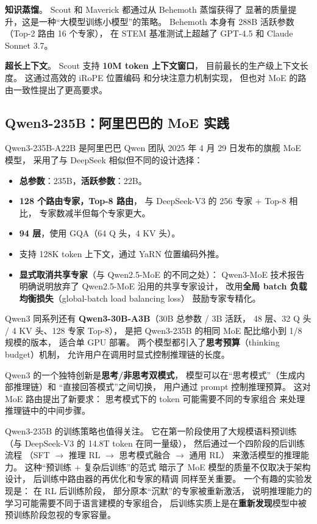 \textbf{知识蒸馏}。
Scout 和 Maverick 都通过从 Behemoth 蒸馏获得了
显著的质量提升，这是一种“大模型训练小模型”的策略。
Behemoth 本身有 288B 活跃参数（Top-2 路由 16 个专家），
在 STEM 基准测试上超越了 GPT-4.5 和 Claude Sonnet 3.7。

\textbf{超长上下文}。
Scout 支持 \textbf{10M token 上下文窗口}，
目前最长的生产级上下文长度。
这通过高效的 iRoPE 位置编码
和分块注意力机制实现，
但也对 MoE 的路由一致性提出了更高要求。

\subsection{Qwen3-235B：阿里巴巴的 MoE 实践}

Qwen3-235B-A22B 是阿里巴巴 Qwen 团队%
2025 年 4 月 29 日发布的旗舰 MoE 模型，
采用了与 DeepSeek 相似但不同的设计选择：

\begin{itemize}[noitemsep]
  \item \textbf{总参数}：235B，\textbf{活跃参数}：22B。
  \item \textbf{128 个路由专家，Top-8 路由}，
        与 DeepSeek-V3 的 256 专家 + Top-8 相比，
        专家数减半但每个专家更大。
  \item \textbf{94 层}，使用 GQA（64 Q 头，4 KV 头）。
  \item 支持 128K token 上下文，通过 YaRN 位置编码外推。
  \item \textbf{显式取消共享专家}（与 Qwen2.5-MoE 的不同之处）：
        Qwen3-MoE 技术报告明确说明放弃了 Qwen2.5-MoE 沿用的共享专家设计，
        改用\textbf{全局 batch 负载均衡损失}（global-batch load balancing loss）
        鼓励专家专精化。
\end{itemize}

Qwen3 同系列还有 \textbf{Qwen3-30B-A3B}（30B 总参数 / 3B 活跃，
48 层、32 Q 头 / 4 KV 头、128 专家 Top-8），
是把 Qwen3-235B 的相同 MoE 配比缩小到 1/8 规模的版本，
适合单 GPU 部署。
两个模型都引入了\textbf{思考预算}（thinking budget）机制，
允许用户在调用时显式控制推理链的长度。

Qwen3 的一个独特创新是\textbf{思考/非思考双模式}，
模型可以在“思考模式”（生成内部推理链）和
“直接回答模式”之间切换，
用户通过 prompt 控制推理预算。
这对 MoE 路由提出了新要求：
思考模式下的 token 可能需要不同的专家组合
来处理推理链中的中间步骤。

Qwen3-235B 的训练策略也值得关注。
它在第一阶段使用了大规模语料预训练
（与 DeepSeek-V3 的 14.8T token 在同一量级），
然后通过一个四阶段的后训练流程
（SFT $\to$ 推理 RL $\to$ 思考模式融合 $\to$ 通用 RL）
来激活模型的推理能力。
这种“预训练 + 复杂后训练”的范式
暗示了 MoE 模型的质量不仅取决于架构设计，
后训练中路由器的再优化和专家的精调
同样至关重要。
一个有趣的实验发现是：
在 RL 后训练阶段，
部分原本“沉默”的专家被重新激活，
说明推理能力的学习可能需要不同于语言建模的专家组合，
后训练实质上是在\textbf{重新发现}模型中被预训练阶段忽视的专家容量。

